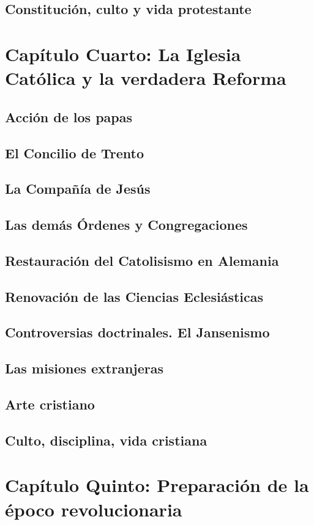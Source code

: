 \raggedbottom{} \documentclass[12pt, a4paper]{book}
\begin{document}
\section{Constitución, culto y vida protestante}
\chapter{Capítulo Cuarto: La Iglesia Católica y la verdadera Reforma}
\section{Acción de los papas}
\section{El Concilio de Trento}
\section{La Compañía de Jesús}
\section{Las demás Órdenes y Congregaciones}
\section{Restauración del Catolisismo en Alemania}
\section{Renovación de las Ciencias Eclesiásticas}
\section{Controversias doctrinales. El Jansenismo}
\section{Las misiones extranjeras}
\section{Arte cristiano}
\section{Culto, disciplina, vida cristiana}
\chapter{Capítulo Quinto: Preparación de la époco revolucionaria}
\end{document}
